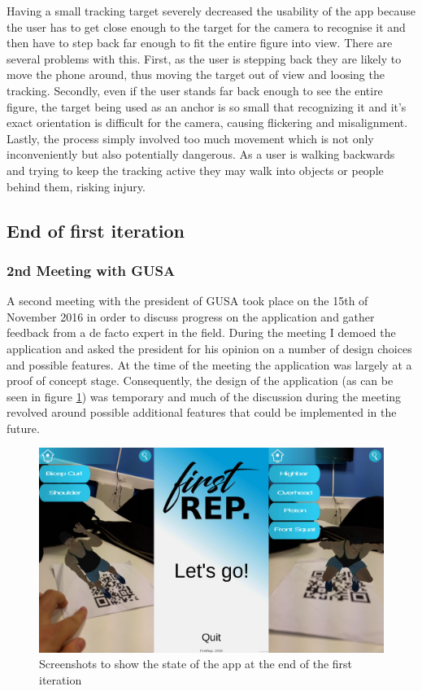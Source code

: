 \documentclass{l4proj}
\begin{document}
Having a small tracking target severely decreased the usability of the app because the user has to get close enough to the target for the camera to recognise it and then have to step back far enough to fit the entire figure into view. There are several problems with this. First, as the user is stepping back they are likely to move the phone around, thus moving the target out of view and loosing the tracking. Secondly, even if the user stands far back enough to see the entire figure, the target being used as an anchor is so small that recognizing it and it's exact orientation is difficult for the camera, causing flickering and misalignment. Lastly, the process simply involved too much movement which is not only inconveniently but also potentially dangerous. As a user is walking backwards and trying to keep the tracking active they may walk into objects or people behind them, risking injury.



\subsection{End of first iteration}
\subsubsection{2nd Meeting with GUSA}
A second meeting with the president of GUSA took place on the 15th of November 2016 in order to discuss progress on the application and gather feedback from a de facto expert in the field. During the meeting I demoed the application and asked the president for his opinion on a number of design choices and possible features. At the time of the meeting the application was largely at a proof of concept stage. Consequently, the design of the application (as can be seen in figure \ref{fig:it1}) was temporary and much of the discussion during the meeting revolved around possible additional features that could be implemented in the future. 

\begin{figure}[h]
\centering
\includegraphics[width=\textwidth]{images/iteration1_screenshots.png}
\caption{Screenshots to show the state of the app at the end of the first iteration}
\label{fig:it1}
\end{figure}
\end{document}

